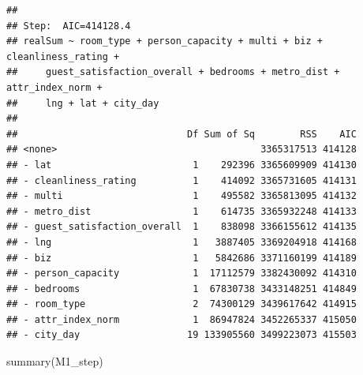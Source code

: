 \documentclass[
]{article}
\newenvironment{Shaded}{\begin{snugshade}}{\end{snugshade}}
\newcommand{\FunctionTok}[1]{\textcolor[rgb]{0.00,0.00,0.00}{#1}}
\newcommand{\NormalTok}[1]{#1}
\begin{document}
\begin{verbatim}
## 
## Step:  AIC=414128.4
## realSum ~ room_type + person_capacity + multi + biz + cleanliness_rating + 
##     guest_satisfaction_overall + bedrooms + metro_dist + attr_index_norm + 
##     lng + lat + city_day
## 
##                              Df Sum of Sq        RSS    AIC
## <none>                                    3365317513 414128
## - lat                         1    292396 3365609909 414130
## - cleanliness_rating          1    414092 3365731605 414131
## - multi                       1    495582 3365813095 414132
## - metro_dist                  1    614735 3365932248 414133
## - guest_satisfaction_overall  1    838098 3366155612 414135
## - lng                         1   3887405 3369204918 414168
## - biz                         1   5842686 3371160199 414189
## - person_capacity             1  17112579 3382430092 414310
## - bedrooms                    1  67830738 3433148251 414849
## - room_type                   2  74300129 3439617642 414915
## - attr_index_norm             1  86947824 3452265337 415050
## - city_day                   19 133905560 3499223073 415503
\end{verbatim}

\begin{Shaded}
\begin{Highlighting}[]
\FunctionTok{summary}\NormalTok{(M1\_step)}
\end{Highlighting}
\end{Shaded}
\end{document}
